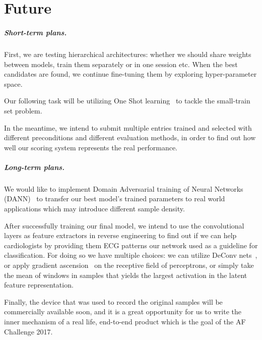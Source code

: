 \chapter{Future}

\paragraph{Short-term plans.}
First, we are testing hierarchical architectures: whether we should share weights between models, train them separately or in one session etc.
When the best candidates are found, we continue fine-tuning them by exploring hyper-parameter space.

Our following task will be utilizing One Shot learning~\cite{santoro_one-shot_2016, vinyals_matching_2016} to tackle the small-train set problem.

In the meantime, we intend to submit multiple entries trained and selected with different preconditions and different evaluation methods, in order to find out how well our scoring system represents the real performance.


\paragraph{Long-term plans.}
We would like to implement Domain Adversarial training of Neural Networks (DANN)~\cite{ganin_domain-adversarial_2015} to transfer our best model's trained parameters to real world applications which may introduce different sample density.

After successfully training our final model, we intend to use the convolutional layers as feature extractors in reverse engineering to find out if we can help cardiologists by providing them ECG patterns our network used as a guideline for classification.
For doing so we have multiple choices: we can utilize DeConv nets~\cite{zeiler2014visualizing}, or apply gradient ascension~\cite{yosinski2015understanding} on the receptive field of perceptrons, or simply take the mean of windows in samples that yields the largest activation in the latent feature representation.

Finally, the device that was used to record the original samples will be commercially available soon, and it is a great opportunity for us to write the inner mechanism of a real life, end-to-end product which is the goal of the AF Challenge 2017.
